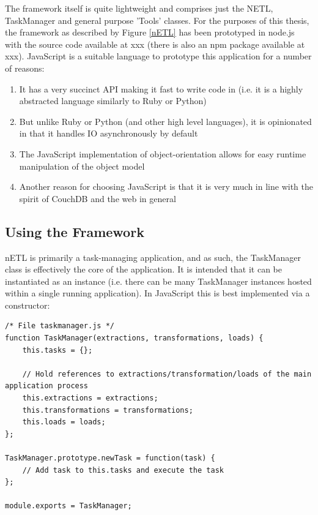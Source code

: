 The framework itself is quite lightweight and comprises just the NETL, TaskManager and general purpose 'Tools' classes. For the purposes of this thesis, the framework as described by Figure \ref{nETL} has been prototyped in node.js with the source code available at xxx (there is also an npm package available at xxx). JavaScript is a suitable language to prototype this application for a number of reasons:

\begin{enumerate}
    \item It has a very succinct API making it fast to write code in (i.e. it is a highly abstracted language similarly to Ruby or Python)
    \item But unlike Ruby or Python (and other high level languages), it is opinionated in that it handles IO asynchronously by default
    \item The JavaScript implementation of object-orientation allows for easy runtime manipulation of the object model
    \item Another reason for choosing JavaScript is that it is very much in line with the spirit of CouchDB and the web in general
\end{enumerate}

\subsection{Using the Framework}

nETL is primarily a task-managing application, and as such, the TaskManager class is effectively the core of the application. It is intended that it can be instantiated as an instance (i.e. there can be many TaskManager instances hosted within a single running application). In JavaScript this is best implemented via a constructor:

\begin{verbatim}
/* File taskmanager.js */
function TaskManager(extractions, transformations, loads) {
    this.tasks = {};

    // Hold references to extractions/transformation/loads of the main application process
    this.extractions = extractions;
    this.transformations = transformations;
    this.loads = loads;
};

TaskManager.prototype.newTask = function(task) {
    // Add task to this.tasks and execute the task
};

module.exports = TaskManager;
\end{verbatim}

